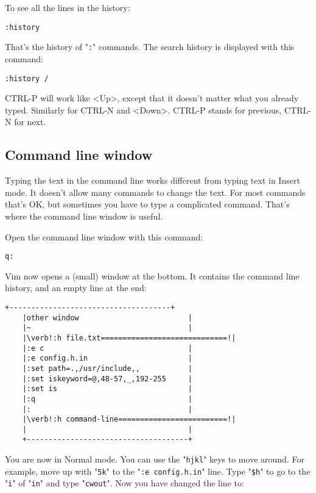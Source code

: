 To see all the lines in the history:

\begin{Verbatim}[samepage=true]
 :history
\end{Verbatim}

That's the history of "\verb!:!" commands.
The search history is displayed with this command:

\begin{Verbatim}[samepage=true]
 :history /
\end{Verbatim}

CTRL-P will work like <Up>, except that it doesn't matter what you already typed.
Similarly for CTRL-N and <Down>.
CTRL-P stands for previous, CTRL-N for next.
\subsection{Command line window}
Typing the text in the command line works different from typing text in Insert mode.
It doesn't allow many commands to change the text.
For most commands that's OK, but sometimes you have to type a complicated command.
That's where the command line window is useful.

Open the command line window with this command:

\begin{Verbatim}[samepage=true]
 q:
\end{Verbatim}

Vim now opens a (small) window at the bottom.
It contains the command line history, and an empty line at the end:

\begin{Verbatim}[samepage=true]
    +-------------------------------------+
    |other window                         |
    |~                                    |
    |\verb!:h file.txt=============================!|
    |:e c                                 |
    |:e config.h.in                       |
    |:set path=.,/usr/include,,           |
    |:set iskeyword=@,48-57,_,192-255     |
    |:set is                              |
    |:q                                   |
    |:                                    |
    |\verb!:h command-line=========================!|
    |                                     |
    +-------------------------------------+
\end{Verbatim}

You are now in Normal mode.
You can use the "\verb!hjkl!" keys to move around.
For example, move up with "\verb!5k!" to the "\verb!:e config.h.in!" line.
Type "\verb!$h!" to go to the "\verb!i!" of "\verb!in!" and type "\verb!cwout!".
Now you have changed the line to:

